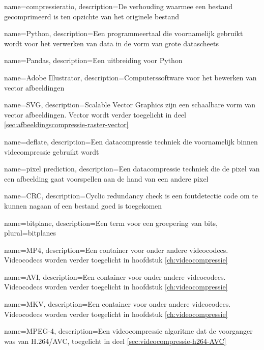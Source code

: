 {
	name={compressieratio},
	description={De verhouding waarmee een bestand gecomprimeerd is ten opzichte van het originele bestand}
}

{
	name={Python},
	description={Een programmeertaal die voornamelijk gebruikt wordt voor het verwerken van data in de vorm van grote datascheets}
}

{
	name={Pandas},
	description={Een uitbreiding voor Python}
}

{
	name={Adobe Illustrator},
	description={Computerssoftware voor het bewerken van vector afbeeldingen}
}

{
	name={SVG},
	description={Scalable Vector Graphics zijn een schaalbare vorm van vector afbeeldingen. Vector wordt verder toegelicht in deel \ref{sec:afbeeldingscompressie-raster-vector}}
}

{
	name={deflate},
	description={Een datacompressie techniek die voornamelijk binnen videcompressie gebruikt wordt}
}

{
	name={pixel prediction},
	description={Een datacompressie techniek die de pixel van een afbeelding gaat voorspellen aan de hand van een andere pixel}
}

{
	name={CRC},
	description={Cyclic redundancy check is een foutdetectie code om te kunnen nagaan of een bestand goed is toegekomen}
}

{
	name={bitplane},
	description={Een term voor een groepering van bits},
	plural={bitplanes}
}

{
	name={MP4},
	description={Een container voor onder andere videocodecs. Videocodecs worden verder toegelicht in hoofdstuk \ref{ch:videocompressie}}
}

{
	name={AVI},
	description={Een container voor onder andere videocodecs. Videocodecs worden verder toegelicht in hoofdstuk \ref{ch:videocompressie}}
}

{
	name={MKV},
	description={Een container voor onder andere videocodecs. Videocodecs worden verder toegelicht in hoofdstuk \ref{ch:videocompressie}}
}

{
	name={MPEG-4},
	description={Een videocompressie algoritme dat de voorganger was van H.264/AVC, toegelicht in deel \ref{sec:videocompressie-h264-AVC}}
}

